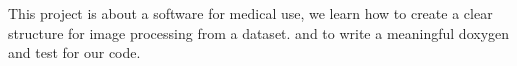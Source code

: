 This project is about a software for medical use, we learn how to create a clear structure for image processing from a dataset. and to write a meaningful doxygen and test for our code. 